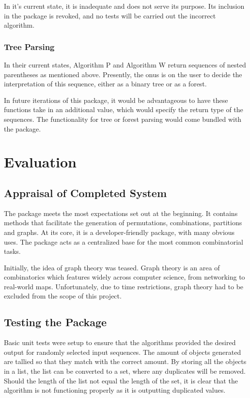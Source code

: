\documentclass[12pt]{article}
\begin{document}
In it's current state, it is inadequate and does not serve its purpose. Its inclusion in the package is revoked, and no tests will be carried out the incorrect algorithm.

\subsubsection{Tree Parsing}
In their current states, Algorithm P and Algorithm W return sequences of nested parentheses as mentioned above. Presently, the onus is on the user to decide the interpretation of this sequence, either as a binary tree or as a forest.

In future iterations of this package, it would be advantageous to have these functions take in an additional value, which would specify the return type of the sequences. The functionality for tree or forest parsing would come bundled with the package.

\pagebreak

\section{Evaluation}
\subsection{Appraisal of Completed System}
The package meets the most expectations set out at the beginning. It contains methods that facilitate the generation of permutations, combinations, partitions and graphs. At its core, it is a developer-friendly package, with many obvious uses. The package acts as a centralized base for the most common combinatorial tasks.

Initially, the idea of graph theory was teased. Graph theory is an area of combinatorics which features widely across computer science, from networking to real-world maps. Unfortunately, due to time restrictions, graph theory had to be excluded from the scope of this project.

\subsection{Testing the Package}
Basic unit tests were setup to ensure that the algorithms provided the desired output for randomly selected input sequences. The amount of objects generated are tallied so that they match with the correct amount. By storing all the objects in a list, the list can be converted to a set, where any duplicates will be removed. Should the length of the list not equal the length of the set, it is clear that the algorithm is not functioning properly as it is outputting duplicated values.
\end{document}

